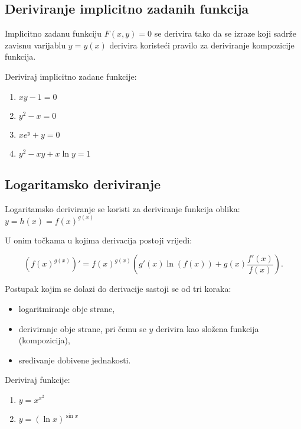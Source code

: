 \subsection{Deriviranje implicitno zadanih funkcija}

Implicitno zadanu funkciju $F(x,y) = 0$ se derivira tako da se izraze koji sadrže
zavisnu varijablu $y=y(x)$ derivira koristeći pravilo za deriviranje kompozicije
funkcija.

\begin{example}
    Deriviraj implicitno zadane funkcije:

    \begin{enumerate}
        \item $xy-1=0$
        \item $y^2-x=0$
        \item $xe^y+y=0$
        \item $y^2-xy+x\ln y = 1$
    \end{enumerate}
\end{example}

\subsection{Logaritamsko deriviranje}

Logaritamsko deriviranje se koristi za deriviranje funkcija oblika: $\displaystyle
y=h(x)=f(x)^{g(x)}
$

U onim točkama u kojima derivacija postoji vrijedi:

$$
\left(f(x)^{g(x)}\right)' = f(x)^{g(x)}\left(g'(x)\ln(f(x))+g(x)\frac{f'(x)}{f(x)}\right).
$$

Postupak kojim se dolazi do derivacije sastoji se od tri koraka:
\begin{itemize}
    \item logaritmiranje obje strane,
    \item deriviranje obje strane, pri čemu se $y$ derivira kao složena funkcija (kompozicija),
    \item sređivanje dobivene jednakosti.
\end{itemize}

\begin{example}
    Deriviraj funkcije:

    \begin{enumerate}
        \item $y=x^{x^2}$
        \item $y=(\ln x)^{\sin x}$
    \end{enumerate}
\end{example}

